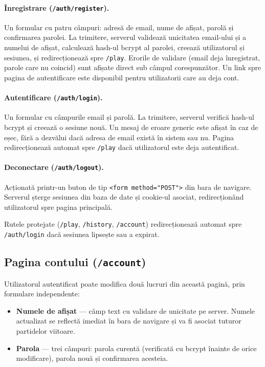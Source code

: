 \documentclass[12pt,a4paper]{article}
\begin{document}
\paragraph{Înregistrare (\texttt{/auth/register}).}
Un formular cu patru câmpuri: adresă de email, nume de afișat, parolă și confirmarea parolei. La trimitere, serverul validează unicitatea email-ului și a numelui de afișat, calculează hash-ul bcrypt al parolei, creează utilizatorul și sesiunea, și redirecționează spre \texttt{/play}. Erorile de validare (email deja înregistrat, parole care nu coincid) sunt afișate direct sub câmpul corespunzător. Un link spre pagina de autentificare este disponibil pentru utilizatorii care au deja cont.

\paragraph{Autentificare (\texttt{/auth/login}).}
Un formular cu câmpurile email și parolă. La trimitere, serverul verifică hash-ul bcrypt și creează o sesiune nouă. Un mesaj de eroare generic este afișat în caz de eșec, fără a dezvălui dacă adresa de email există în sistem sau nu. Pagina redirecționează automat spre \texttt{/play} dacă utilizatorul este deja autentificat.

\paragraph{Deconectare (\texttt{/auth/logout}).}
Acționată printr-un buton de tip \texttt{<form method="POST">} din bara de navigare. Serverul șterge sesiunea din baza de date și cookie-ul asociat, redirecționând utilizatorul spre pagina principală.

Rutele protejate (\texttt{/play}, \texttt{/history}, \texttt{/account}) redirecționează automat spre \texttt{/auth/login} dacă sesiunea lipsește sau a expirat.

\subsection{Pagina contului (\texttt{/account})}

Utilizatorul autentificat poate modifica două lucruri din această pagină, prin formulare independente:

\begin{itemize}
  \item \textbf{Numele de afișat} — câmp text cu validare de unicitate pe server. Numele actualizat se reflectă imediat în bara de navigare și va fi asociat tuturor partidelor viitoare.
  \item \textbf{Parola} — trei câmpuri: parola curentă (verificată cu bcrypt înainte de orice modificare), parola nouă și confirmarea acesteia.
\end{itemize}
\end{document}
